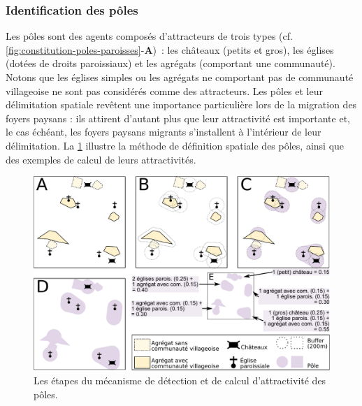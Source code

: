 \subsubsection{Identification des pôles \label{sssec:poles}}

Les pôles sont des agents composés d'attracteurs de trois types (cf. \cref{fig:constitution-poles-paroisses}-\textbf{A}) : les châteaux (petits et gros), les églises (dotées de droits paroissiaux) et les agrégats (comportant une communauté).
Notons que les églises simples ou les agrégats ne comportant pas de communauté villageoise ne sont pas considérés comme des attracteurs.
Les pôles et leur délimitation spatiale revêtent une importance particulière lors de la migration des foyers paysans : ils attirent d'autant plus que leur attractivité est importante et, le cas échéant, les foyers paysans migrants s'installent à l'intérieur de leur délimitation.
La \cref{fig:detection-poles} illustre la méthode de définition spatiale des pôles, ainsi que des exemples de calcul de leurs attractivités.

\begin{figure}[H]
	\centering
	\includegraphics[width=.95\linewidth]{img/detection_poles.pdf}
	\caption{Les étapes du mécanisme de détection et de calcul d'attractivité des pôles.}
	\label{fig:detection-poles}
\end{figure}

